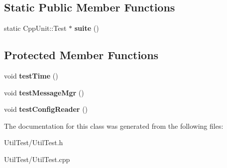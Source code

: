 \subsection*{Static Public Member Functions}
\begin{DoxyCompactItemize}
\item 
static Cpp\+Unit\+::\+Test $\ast$ {\bfseries suite} ()\hypertarget{class_util_1_1_util_test_a6aea16da6a30f2da7c331884402678e9}{}\label{class_util_1_1_util_test_a6aea16da6a30f2da7c331884402678e9}

\end{DoxyCompactItemize}
\subsection*{Protected Member Functions}
\begin{DoxyCompactItemize}
\item 
void {\bfseries test\+Time} ()\hypertarget{class_util_1_1_util_test_a6df1223c040166a5e42610f6ceb76666}{}\label{class_util_1_1_util_test_a6df1223c040166a5e42610f6ceb76666}

\item 
void {\bfseries test\+Message\+Mgr} ()\hypertarget{class_util_1_1_util_test_a3e88702de7b7d45377b1dc99f22bbc3a}{}\label{class_util_1_1_util_test_a3e88702de7b7d45377b1dc99f22bbc3a}

\item 
void {\bfseries test\+Config\+Reader} ()\hypertarget{class_util_1_1_util_test_ae46a726defc5ffe24f126ca1d7da3775}{}\label{class_util_1_1_util_test_ae46a726defc5ffe24f126ca1d7da3775}

\end{DoxyCompactItemize}


The documentation for this class was generated from the following files\+:\begin{DoxyCompactItemize}
\item 
Util\+Test/Util\+Test.\+h\item 
Util\+Test/Util\+Test.\+cpp\end{DoxyCompactItemize}
